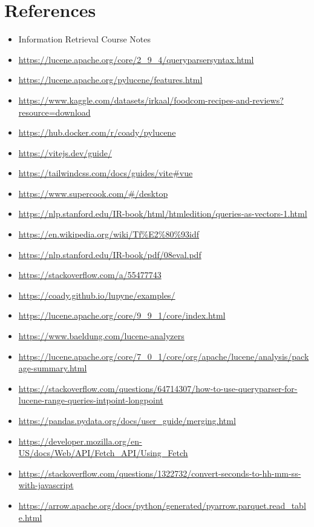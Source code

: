 \documentclass{article}
\begin{document}
\section{References}
\begin{itemize}
    \item Information Retrieval Course Notes
    \item \url{https://lucene.apache.org/core/2_9_4/queryparsersyntax.html}
    \item \url{https://lucene.apache.org/pylucene/features.html}
    \item \url{https://www.kaggle.com/datasets/irkaal/foodcom-recipes-and-reviews?resource=download}
    \item \url{https://hub.docker.com/r/coady/pylucene}
    \item \url{https://vitejs.dev/guide/}
    \item \url{https://tailwindcss.com/docs/guides/vite#vue}
    \item \url{https://www.supercook.com/#/desktop}
    \item \url{https://nlp.stanford.edu/IR-book/html/htmledition/queries-as-vectors-1.html}
    \item \url{https://en.wikipedia.org/wiki/Tf%E2%80%93idf}
    \item \url{https://nlp.stanford.edu/IR-book/pdf/08eval.pdf}
    \item \url{https://stackoverflow.com/a/55477743}
    \item \url{https://coady.github.io/lupyne/examples/}
    \item \url{https://lucene.apache.org/core/9_9_1/core/index.html}
    \item \url{https://www.baeldung.com/lucene-analyzers}
    \item \url{https://lucene.apache.org/core/7_0_1/core/org/apache/lucene/analysis/package-summary.html}
    \item \url{https://stackoverflow.com/questions/64714307/how-to-use-queryparser-for-lucene-range-queries-intpoint-longpoint}
    \item \url{https://pandas.pydata.org/docs/user_guide/merging.html}
    \item \url{https://developer.mozilla.org/en-US/docs/Web/API/Fetch_API/Using_Fetch}
    \item \url{https://stackoverflow.com/questions/1322732/convert-seconds-to-hh-mm-ss-with-javascript}
    \item \url{https://arrow.apache.org/docs/python/generated/pyarrow.parquet.read_table.html}
\end{itemize}
\end{document}
